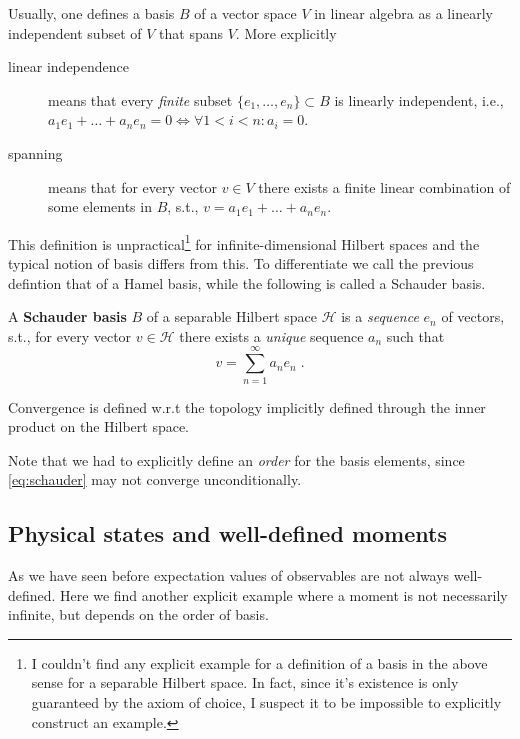 Usually, one defines a basis $B$ of a vector space $V$ in linear algebra as a linearly independent subset of $V$ that spans $V$. More explicitly
\begin{description}
	\item[linear independence] means that every \emph{finite} subset $\{e_{1}, \ldots, e_{n}\} \subset B$ is linearly independent, i.e., $a_{1} e_{1} + \ldots + a_{n} e_{n} = 0 \iff \forall 1 < i < n: a_{i} = 0$.
	\item[spanning] means that for every vector $v \in V$ there exists a finite linear combination of some elements in $B$, s.t., $v = a_{1} e_{1} + \ldots + a_{n} e_{n}$.
\end{description}

This definition is unpractical\footnote{I couldn't find any explicit example for a definition of a basis in the above sense for a separable Hilbert space. In fact, since it's existence is only guaranteed by the axiom of choice, I suspect it to be impossible to explicitly construct an example.} for infinite-dimensional Hilbert spaces and the typical notion of basis differs from this. To differentiate we call the previous defintion that of a Hamel basis, while the following is called a Schauder basis.

A \textbf{Schauder basis} $B$ of a separable Hilbert space $\mathcal{H}$ is a \emph{sequence} $e_{n}$ of vectors, s.t., for every vector $v \in \mathcal{H}$ there exists a \emph{unique} sequence $a_{n}$ such that
\begin{equation}\label{eq:schauder}
	v = \sum_{n=1}^{\infty} a_{n} e_{n} \; .
\end{equation}

Convergence is defined w.r.t the topology implicitly defined through the inner product on the Hilbert space.

Note that we had to explicitly define an \emph{order} for the basis elements, since \eqref{eq:schauder} may not converge unconditionally.


\subsection{Physical states and well-defined moments}\label{rp_qm_trace}
As we have seen before expectation values of observables are not always well-defined. Here we find another explicit example where a moment is not necessarily infinite, but depends on the order of basis.

